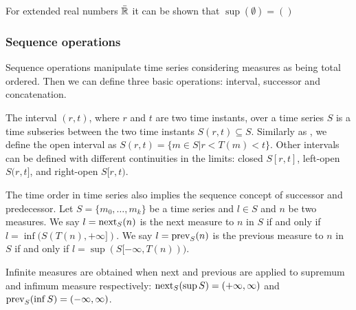 



For extended real numbers $\bar{\mathbb{R}}$ it can be shown that $\sup(\emptyset)=()$








\subsubsection{Sequence operations}

Sequence operations manipulate time series considering measures as
being total ordered. Then we can define three basic operations:
interval, successor and concatenation.


The interval $(r,t)$, where $r$ and $t$ are two time instants, over a
time series $S$ is a time subseries between the two time instants
$S(r,t) \subseteq S$. Similarly as \cite{last:hetland}, we define the
open interval as $S(r,t)=\{m\in S | r<T(m)<t\}$. Other intervals can
be defined with different continuities in the limits: closed $S[r,t]$,
left-open $S(r,t]$, and right-open $S[r,t)$.

The time order in time series also implies the sequence concept of
successor and predecessor.  Let $S=\{m_0, \ldots, m_k\}$ be a time
series and $l\in S$ and $n$ be two measures. We say $l=\operatorname*{next}_S(n)$ is the next
measure to $n$ in $S$ if and only if $l=\inf(S(T(n),+\infty])$.  We
say $l=\operatorname*{prev}_S(n)$ is the previous measure to $n$ in $S$ if and only if
$l=\sup(S[-\infty,T(n)))$. 

Infinite measures are obtained when next and previous are applied to
supremum and infimum measure respectively: $\operatorname*{next}_S(\sup
S)=(+\infty,\infty)$ and $\operatorname*{prev}_S(\inf S)=(-\infty,\infty)$.



